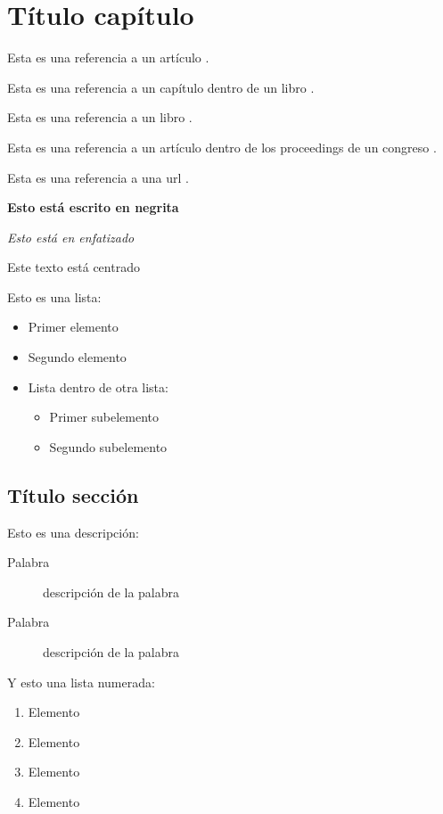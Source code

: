 \chapter{Título capítulo}

Esta es una referencia a un artículo \cite{article-minimal}.

Esta es una referencia a un capítulo dentro de un libro \cite{inbook-minimal}.

Esta es una referencia a un libro \cite{book-minimal}.

Esta es una referencia a un artículo dentro de los proceedings de un congreso \cite{inproceedings-full}.

Esta es una referencia a una url \cite{misc-url}.

\textbf{Esto está escrito en negrita}


\emph{Esto está en enfatizado}

\begin{center}
Este texto está centrado
\end{center}


Esto es una lista:
\begin{itemize}
\item Primer elemento
\item Segundo elemento
\item Lista dentro de otra lista:
	\begin{itemize}
		\item Primer subelemento
		\item Segundo subelemento
	\end{itemize}
\end{itemize}


\section{Título sección}

Esto es una descripción:
\begin{description}
\item[Palabra] descripción de la palabra
\item[Palabra] descripción de la palabra
\end{description}


Y esto una lista numerada:
\begin{enumerate}
\item Elemento
\item Elemento
\item Elemento
\item Elemento
\end{enumerate}


